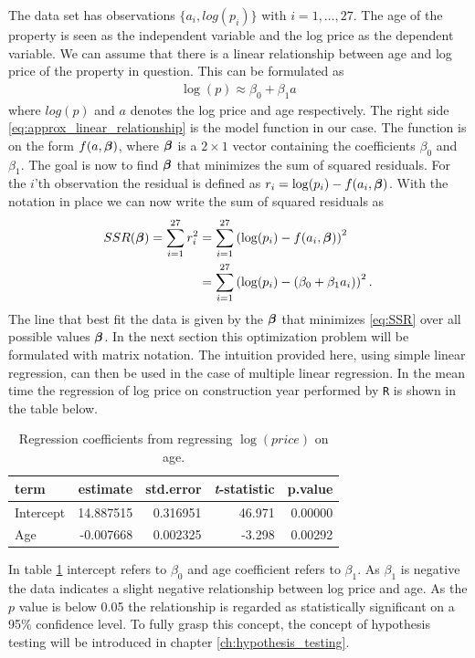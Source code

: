 The data set has observations $\{a_i, log(p_i)\}$ with $i = 1, \ldots, 27$. 
The age of the property is seen as the independent variable and the log price as the dependent variable.
We can assume that there is a linear relationship between age and log price of the property in question.
This can be formulated as
\begin{align}\label{eq:approx_linear_relationship}
    \log(p) \approx \beta_0 + \beta_1 a
\end{align}
where $log(p)$ and $a$ denotes the log price and age respectively.
The right side \eqref{eq:approx_linear_relationship} is the model function in our case.
The function is on the form $f(a, \operatorname{\boldsymbol{\beta}})$, where $\operatorname{\boldsymbol{\beta}}$ is a $2 \times 1$ vector containing the coefficients $\beta_0$ and $\beta_1$.
The goal is now to find $\operatorname{\boldsymbol{\beta}}$ that minimizes the sum of squared residuals.
For the $i$'th observation the residual is defined as $r_i = \log(p_i) - f(a_i, \operatorname{\boldsymbol{\beta}})$.
With the notation in place we can now write the sum of squared residuals as
\begin{align}
  SSR(\operatorname{\boldsymbol{\beta}}) = \sum_{i = 1}^{27} r_i^2 &= \sum_{i = 1}^{27} \left( \log(p_i) - f(a_i, \operatorname{\boldsymbol{\beta}}) \right)^2 \nonumber\\
  &= \sum_{i = 1}^{27} \left( \log(p_i) - (\beta_0 + \beta_1 a_i) \right)^2.\label{eq:SSR}
\end{align}
The line that best fit the data is given by the $\operatorname{\boldsymbol{\beta}}$ that minimizes \eqref{eq:SSR} over all possible values $\operatorname{\boldsymbol{\beta}}$.
In the next section this optimization problem will be formulated with matrix notation.
The intuition provided here, using simple linear regression, can then be used in the case of multiple linear regression.
In the mean time the regression of log price on construction year performed by \texttt{R} is shown in the table below.
\begin{table}[H]
    \centering
    \begin{tabular}{lrrrr}
        \toprule
        \textbf{term} & \textbf{estimate} & \textbf{std.error} & \textbf{\textit{t}-statistic} & \textbf{p.value}\\
        \midrule
        Intercept & 14.887515 & 0.316951 & 46.971 & 0.00000\\
        Age & -0.007668 & 0.002325 & -3.298 & 0.00292\\
        \bottomrule
    \end{tabular}
    \caption{Regression coefficients from regressing $\log(price)$ on age.}
    \label{tab:regress_log_price_on_age}
\end{table}
In table \ref{tab:regress_log_price_on_age} intercept refers to $\beta_0$ and age coefficient refers to $\beta_1$.
As $\beta_1$ is negative the data indicates a slight negative relationship between log price and age.
As the $p$ value is below 0.05 the relationship is regarded as statistically significant on a 95\% confidence level.
To fully grasp this concept, the concept of hypothesis testing will be introduced in chapter \ref{ch:hypothesis_testing}.

